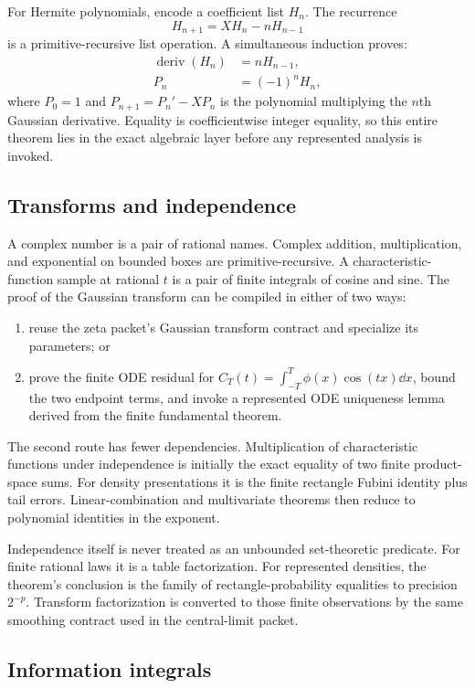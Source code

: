 For Hermite polynomials, encode a coefficient list $H_n$.  The recurrence
\[
 H_{n+1}=XH_n-nH_{n-1}
\]
is a primitive-recursive list operation.  A simultaneous induction proves:
\begin{align*}
 \operatorname{deriv}(H_n)&=nH_{n-1},\\
 P_n&=(-1)^nH_n,
\end{align*}
where $P_0=1$ and $P_{n+1}=P_n'-XP_n$ is the polynomial multiplying the $n$th Gaussian derivative.  Equality is coefficientwise integer equality, so this entire theorem lies in the exact algebraic layer before any represented analysis is invoked.

\subsection{Transforms and independence}

A complex number is a pair of rational names.  Complex addition, multiplication, and exponential on bounded boxes are primitive-recursive.  A characteristic-function sample at rational $t$ is a pair of finite integrals of cosine and sine.  The proof of the Gaussian transform can be compiled in either of two ways:
\begin{enumerate}[label=(\alph*)]
  \item reuse the zeta packet's Gaussian transform contract and specialize its parameters; or
  \item prove the finite ODE residual for $C_T(t)=\int_{-T}^T\phi(x)\cos(tx)\dd x$, bound the two endpoint terms, and invoke a represented ODE uniqueness lemma derived from the finite fundamental theorem.
\end{enumerate}
The second route has fewer dependencies.  Multiplication of characteristic functions under independence is initially the exact equality of two finite product-space sums.  For density presentations it is the finite rectangle Fubini identity plus tail errors.  Linear-combination and multivariate theorems then reduce to polynomial identities in the exponent.

Independence itself is never treated as an unbounded set-theoretic predicate.  For finite rational laws it is a table factorization.  For represented densities, the theorem's conclusion is the family of rectangle-probability equalities to precision $2^{-p}$.  Transform factorization is converted to those finite observations by the same smoothing contract used in the central-limit packet.

\subsection{Information integrals}

